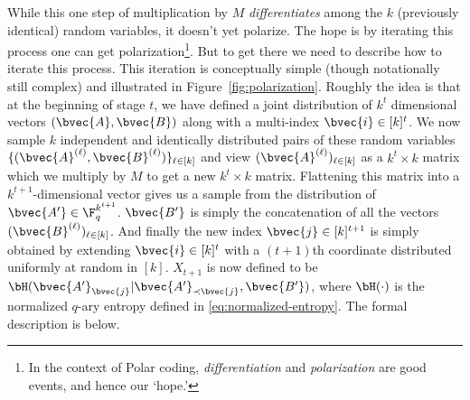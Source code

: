 \documentclass[11pt]{article}
\begin{document}
While this one step of multiplication by $M$ {\em differentiates} among the $k$ (previously identical) random variables, it doesn't yet polarize. The hope is by iterating this process one can get polarization\footnote{In the context of Polar coding, {\em differentiation} and {\em polarization} are good events, and hence our `hope.'}. But to get there we need to describe how to iterate this process. This iteration is conceptually simple (though notationally still complex) and illustrated in
Figure~\ref{fig:polarization}.
Roughly the idea is that at the beginning of stage $t$, we have defined a joint distribution of $k^t$ dimensional vectors
$(\bvec{A},\bvec{B})$ along with a multi-index $\bvec{i}\in [k]^t$. We now sample  $k$ independent and identically distributed pairs of these random variables  $\{(\bvec{A}^{(\ell)},\bvec{B}^{(\ell)})\}_{\ell \in [k]}$ and view $(\bvec{A}^{(\ell)})_{\ell\in [k]}$ as a $k^t \times k$ matrix which we multiply by $M$ to get a new $k^t \times k$ matrix. Flattening this matrix into a $k^{t+1}$-dimensional vector gives us a sample from the distribution of $\bvec{A'} \in \F_q^{k^{t+1}}$. $\bvec{B'}$ is simply the concatenation of all the
vectors $(\bvec{B}^{(\ell)})_{\ell \in [k]}$. And finally the new index $\bvec{j}\in [k]^{t+1}$ is simply obtained by extending $\bvec{i} \in [k]^t$ with a $(t+1)$th coordinate distributed uniformly at random in $[k]$. $X_{t+1}$ is now defined to be
$\bH(\bvec{A'}_\bvec{j} | \bvec{A'}_{\prec \bvec{j}},\bvec{B'})$, where $\bH(\cdot)$ is the normalized $q$-ary entropy defined in \eqref{eq:normalized-entropy}. The formal description is below.
\end{document}
